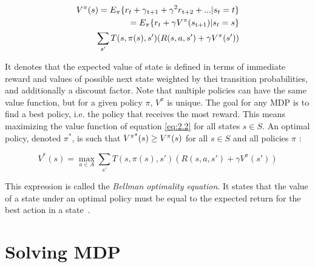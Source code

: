 \begin{equation}
\begin{split}
	V^\pi (s) = E_\pi\{r_t + \gamma\textsubscript{t+1} + \gamma^2 r\textsubscript{t+2} + ... | s_t = t\} \\
	= E_\pi \{r_t + \gamma V^\pi(s\textsubscript{t+1}) | s_t = s\} \\
	\sum_{s'}T(s, \pi(s), s') (R(s, a, s') + \gamma V^\pi (s'))
\end{split}	
\end{equation}

It denotes that the expected value of state is defined in terms of immediate reward and values of possible next state weighted by thei transition probabilities, and additionally a discount factor. Note that multiple policies can have the same value function, but for a given policy $\pi$, $V^\pi$ is unique. The goal for any MDP is to find a best policy, i.e. the policy that receives the most reward. This means maximizing the value function of equation \ref{eq:2.2} for all states $s \in S$. An optimal policy, denoted $\pi^*$, is such that $V\textsuperscript{$\pi$*} (s) \geq V^\pi (s)$ for all $s \in S$ and all policies $\pi$ :

\begin{equation} 
\label{eq:2.5}
V^*(s) = \max_{a \in A} \sum_{s'}T(s, \pi(s), s') (R(s, a, s') + \gamma V^\pi (s'))
\end{equation}

This expression is called the \textit{Bellman optimality equation}. It states that the value of a state under an optimal policy must be equal to the expected return for the best action in a state~\cite{wiering2012reinforcement}.

\section{Solving MDP}

